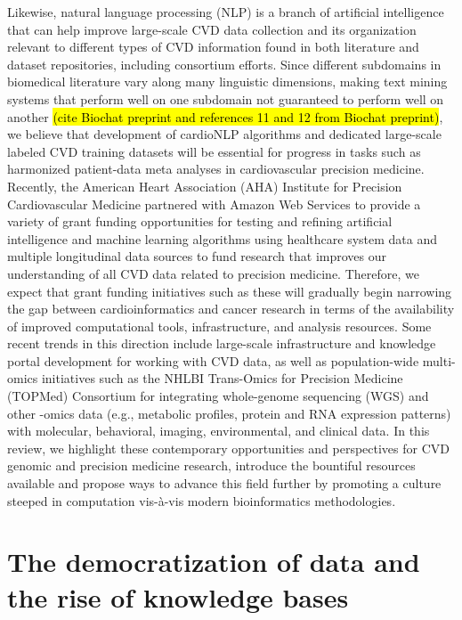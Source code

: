 \documentclass[letter]{bioinfo}
\begin{document}
Likewise, natural language processing (NLP) is a branch of artificial intelligence that can help improve large-scale CVD data collection and its organization relevant to different types of CVD information found in both literature and dataset repositories, including consortium efforts.  Since different subdomains in biomedical literature vary along many linguistic dimensions, making text mining systems that perform well on one subdomain not guaranteed to perform well on another \hl{(cite Biochat preprint and references 11 and 12 from Biochat preprint)}, we believe that development of cardioNLP algorithms and dedicated large-scale labeled CVD training datasets will be essential for progress in tasks such as harmonized patient-data meta analyses in cardiovascular precision medicine.  Recently, the American Heart Association (AHA) Institute for Precision Cardiovascular Medicine partnered with Amazon Web Services to provide a variety of grant funding opportunities for testing and refining artificial intelligence and machine learning algorithms using healthcare system data and multiple longitudinal data sources to fund research that improves our understanding of all CVD data related to precision medicine.  Therefore, we expect that grant funding initiatives such as these will gradually begin narrowing the gap between cardioinformatics and cancer research in terms of the availability of improved computational tools, infrastructure, and analysis resources.  Some recent trends in this direction include large-scale infrastructure and knowledge portal development \citep{Kass-Hout:2018:American, Khomtchouk:2018:HeartBioPortal, Broad:NA:Cardiovascular, Broad:NA:Cerebrovascular} for working with CVD data, as well as population-wide multi-omics initiatives such as the NHLBI Trans-Omics for Precision Medicine (TOPMed) Consortium \citep{NHLBI:2014:TransOmics} for integrating whole-genome sequencing (WGS) and other -omics data (e.g., metabolic profiles, protein and RNA expression patterns) with molecular, behavioral, imaging, environmental, and clinical data.  In this review, we highlight these contemporary opportunities and perspectives for CVD genomic and precision medicine research, introduce the bountiful resources available and propose ways to advance this field further by promoting a culture steeped in computation vis-\`{a}-vis modern bioinformatics methodologies.


\section*{The democratization of data and the rise of knowledge bases}
\end{document}
